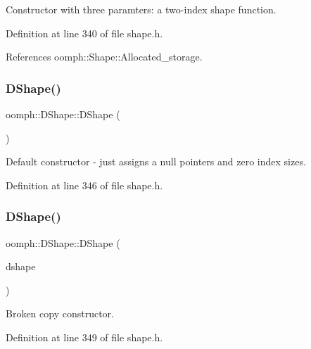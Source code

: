 Constructor with three paramters\+: a two-\/index shape function. 



Definition at line 340 of file shape.\+h.



References oomph\+::\+Shape\+::\+Allocated\+\_\+storage.

\mbox{\label{classoomph_1_1DShape_a7a9884025650edf558112081e53d4dbb}} 
\subsubsection{\texorpdfstring{D\+Shape()}{DShape()}\hspace{0.1cm}{\footnotesize\ttfamily [3/4]}}
{\footnotesize\ttfamily oomph\+::\+D\+Shape\+::\+D\+Shape (\begin{DoxyParamCaption}{ }\end{DoxyParamCaption})\hspace{0.3cm}{\ttfamily [inline]}}

Default constructor -\/ just assigns a null pointers and zero index sizes. 

Definition at line 346 of file shape.\+h.

\mbox{\label{classoomph_1_1DShape_a0624fe8be38d00a98802c6230acd7ed2}} 
\subsubsection{\texorpdfstring{D\+Shape()}{DShape()}\hspace{0.1cm}{\footnotesize\ttfamily [4/4]}}
{\footnotesize\ttfamily oomph\+::\+D\+Shape\+::\+D\+Shape (\begin{DoxyParamCaption}\item[{const \hyperlink{classoomph_1_1DShape}{D\+Shape} \&}]{dshape }\end{DoxyParamCaption})\hspace{0.3cm}{\ttfamily [inline]}}



Broken copy constructor. 



Definition at line 349 of file shape.\+h.



